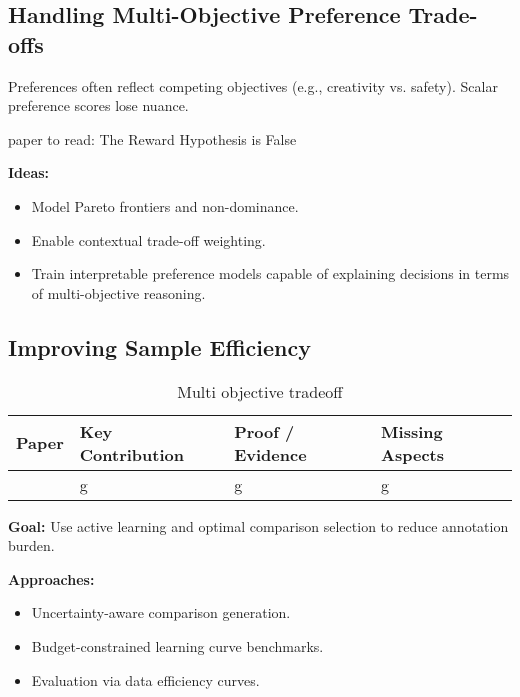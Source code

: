 \documentclass[sigconf]{acmart}
\begin{document}
\subsection{Handling Multi-Objective Preference Trade-offs}

Preferences often reflect competing objectives (e.g., creativity vs. safety). Scalar preference scores lose nuance.

paper to read: 
The Reward Hypothesis is False 


\textbf{Ideas:}
\begin{itemize}
    \item Model Pareto frontiers and non-dominance.
    \item Enable contextual trade-off weighting.
    \item Train interpretable preference models capable of explaining decisions in terms of multi-objective reasoning.
\end{itemize}

\subsection{Improving Sample Efficiency}


\begin{table}[h]
\caption{Multi objective tradeoff}
\begin{adjustbox}{width=\linewidth}

\begin{tabular}{|p{1cm}|p{4cm}|p{4cm}|p{3cm}|}
\hline
\textbf{Paper} & \textbf{Key Contribution} & \textbf{Proof / Evidence} & \textbf{Missing Aspects} \\
\hline
\cite{yang2024rewardsincontextmultiobjectivealignmentfoundation} & g & g & g \\
\hline
\end{tabular}
\end{adjustbox}
\end{table}


\textbf{Goal:} Use active learning and optimal comparison selection to reduce annotation burden.

\textbf{Approaches:}
\begin{itemize}
    \item Uncertainty-aware comparison generation.
    \item Budget-constrained learning curve benchmarks.
    \item Evaluation via data efficiency curves.
\end{itemize}
\end{document}
